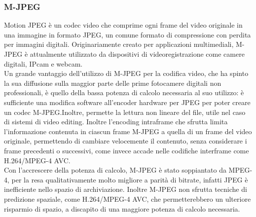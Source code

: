 		\subsubsection{M-JPEG}
			Motion JPEG	è un codec video che comprime ogni frame del video originale in una immagine in formato JPEG, un comune formato di compressione con perdita per immagini digitali. Originariamente creato per applicazioni multimediali, M-JPEG è attualmente utilizzato da dispositivi di videoregistrazione come camere digitali, IPcam e webcam.
			\\
			Un grande vantaggio dell'utilizzo di M-JPEG per la codifica video, che ha spinto la sua diffusione sulla maggior parte delle prime fotocamere digitali non professionali, è quello della bassa potenza di calcolo necessaria al suo utilizzo: è sufficiente una modifica software all'encoder hardware per JPEG per poter creare un codec M-JPEG.\@ Inoltre, permette la lettura non lineare del file, utile nel caso di sistemi di video editing. Inoltre l'encoding intraframe che sfrutta limita l'informazione contenuta in ciascun frame M-JPEG a quella di un frame del video originale, permettendo di cambiare velocemente il contenuto, senza considerare i frame precedenti o successivi, come invece accade nelle codifiche interframe come H.264/MPEG-4 AVC.\@
			\\
			Con l'accrescere della potenza di calcolo, M-JPEG	è stato soppiantato da MPEG-4, per la resa qualitativamente molto migliore a parità di bitrate, infatti JPEG è inefficiente nello spazio di archiviazione. Inoltre M-JPEG non sfrutta tecniche di predizione spaziale, come H.264/MPEG-4 AVC, che permetterebbero un ulteriore risparmio di spazio, a discapito di una maggiore potenza di calcolo necessaria.

